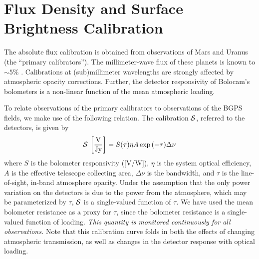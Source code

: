 \documentclass[12pt,preprint]{aastex}
\begin{document}
\section{Flux Density and Surface Brightness Calibration}
\label{sec:FluxCalibration}

The absolute flux calibration is obtained from observations of Mars
and Uranus
(the ``primary calibrators'').  The millimeter-wave flux of these
planets is known to $\sim 5\%$ \citep{orton86,griffin93}.
Calibrations at (sub)millimeter wavelengths are strongly affected by
atmospheric opacity corrections.  Further, the detector responsivity
of Bolocam's bolometers is a non-linear function of the mean
atmospheric loading.

To relate observations of the primary calibrators to observations of
the BGPS fields, we make use of the following relation.  The
calibration ${\cal S}$, referred to the detectors, is given by
\begin{equation}
\label{eq:Calibration}
{\cal S} \, \left[\mathrm{\frac{V}{Jy}}\right] = 
S(\tau) \eta A \exp{(-\tau)} \Delta\nu
\end{equation}
where $S$ is the bolometer responsivity ([V/W]), $\eta$ is the system
optical efficiency, $A$ is the effective telescope collecting area,
$\Delta \nu$ is the bandwidth, and $\tau$ is the line-of-sight,
in-band atmosphere opacity.  Under the assumption that the only power
variation on the detectors is due to the power from the atmosphere,
which may be parameterized by $\tau$, ${\cal S}$ is a single-valued
function of $\tau$.  We have used the mean bolometer resistance as a
proxy for $\tau$, since the bolometer resistance is a single-valued
function of loading.  {\it This quantity is monitored continuously for
all observations.}  Note that this calibration curve folds in both the
effects of changing atmospheric transmission, as well as changes in
the detector response with optical loading.

%
\end{document}
